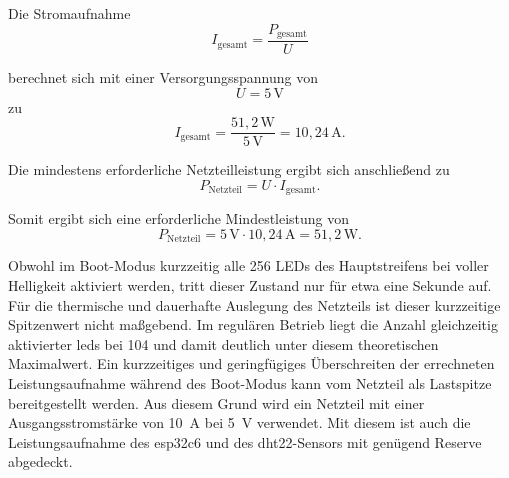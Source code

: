 Die Stromaufnahme 
\[
I_{\text{gesamt}} = \frac{P_{\text{gesamt}}}{U}
\]

berechnet sich mit einer Versorgungsspannung von  
\[
U = 5\,\text{V}
\]
zu  
\[
I_{\text{gesamt}} = \frac{51{,}2\,\text{W}}{5\,\text{V}}
= 10{,}24\,\text{A}.
\]

Die mindestens erforderliche Netzteilleistung ergibt sich anschließend zu  
\[
P_{\text{Netzteil}} = U \cdot I_{\text{gesamt}}.
\]

Somit ergibt sich eine erforderliche Mindestleistung von 
\[
P_{\text{Netzteil}} = 5\,\text{V} \cdot 10{,}24\,\text{A}
= 51{,}2\,\text{W}.
\]

Obwohl im Boot-Modus kurzzeitig alle 256 LEDs des Hauptstreifens bei voller Helligkeit aktiviert werden, tritt dieser Zustand nur für etwa eine Sekunde auf. 
Für die thermische und dauerhafte Auslegung des Netzteils ist dieser kurzzeitige Spitzenwert nicht maßgebend.
Im regulären Betrieb liegt die Anzahl gleichzeitig aktivierter \gls{led}s bei 104 und damit deutlich unter diesem theoretischen Maximalwert.
Ein kurzzeitiges und geringfügiges Überschreiten der errechneten Leistungsaufnahme während des Boot-Modus kann vom Netzteil als Lastspitze bereitgestellt werden.
Aus diesem Grund wird ein Netzteil mit einer Ausgangsstromstärke von \SI{10}{\ampere} bei \SI{5}{\volt} verwendet.
Mit diesem ist auch die Leistungsaufnahme des \gls{esp32c6} und des \gls{dht22}-Sensors mit genügend Reserve abgedeckt.